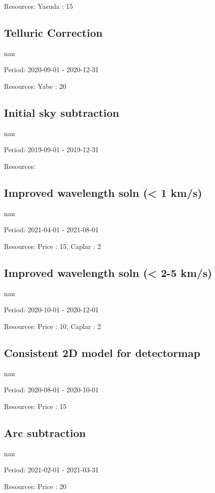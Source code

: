 Resources: Yasuda : 15

\subsection{Telluric Correction}

nan

Period: 2020-09-01 - 2020-12-31

Resources: Yabe : 20

\subsection{Initial sky subtraction}

nan

Period: 2019-09-01 - 2019-12-31

Resources: 

\subsection{Improved wavelength soln (< 1 km/s)}

nan

Period: 2021-04-01 - 2021-08-01

Resources: Price : 15, Caplar : 2

\subsection{Improved wavelength soln (< 2-5 km/s)}

nan

Period: 2020-10-01 - 2020-12-01

Resources: Price : 10, Caplar : 2

\subsection{Consistent 2D model for detectormap}

nan

Period: 2020-08-01 - 2020-10-01

Resources: Price : 15

\subsection{Arc subtraction}

nan

Period: 2021-02-01 - 2021-03-31

Resources: Price : 20

